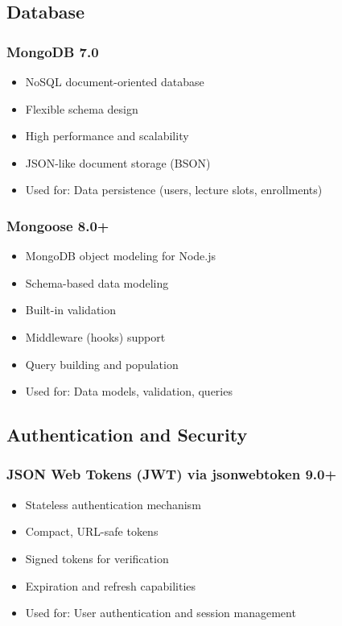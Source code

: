 \documentclass[12pt,a4paper]{report}
\begin{document}
\subsection{Database}

\subsubsection{MongoDB 7.0}
\begin{itemize}[leftmargin=*]
    \item NoSQL document-oriented database
    \item Flexible schema design
    \item High performance and scalability
    \item JSON-like document storage (BSON)
    \item Used for: Data persistence (users, lecture slots, enrollments)
\end{itemize}

\subsubsection{Mongoose 8.0+}
\begin{itemize}[leftmargin=*]
    \item MongoDB object modeling for Node.js
    \item Schema-based data modeling
    \item Built-in validation
    \item Middleware (hooks) support
    \item Query building and population
    \item Used for: Data models, validation, queries
\end{itemize}

\subsection{Authentication and Security}

\subsubsection{JSON Web Tokens (JWT) via jsonwebtoken 9.0+}
\begin{itemize}[leftmargin=*]
    \item Stateless authentication mechanism
    \item Compact, URL-safe tokens
    \item Signed tokens for verification
    \item Expiration and refresh capabilities
    \item Used for: User authentication and session management
\end{itemize}
\end{document}
